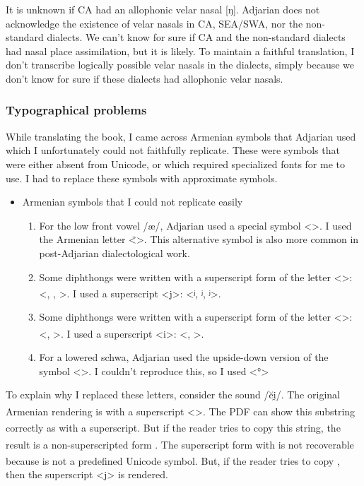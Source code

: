 It is unknown if CA had an allophonic velar nasal [ŋ]. Adjarian does not acknowledge the existence of velar nasals in CA, SEA/SWA, nor the non-standard dialects. We can't know for sure if CA and the non-standard dialects had nasal place assimilation, but it is likely. To maintain a faithful translation, I don't transcribe logically possible velar nasals in the dialects, simply because we don't know for sure if these dialects had allophonic velar nasals. 

\subsubsection{Typographical problems}\label{sec:HossepIntro:phonotransc:adj:typograph}

While translating the book, I came across Armenian symbols that Adjarian used which I unfortunately could not faithfully replicate. These were symbols that were either absent from Unicode, or which required specialized fonts for me to use. I had to replace these symbols with approximate symbols. 

\begin{itemize}
	\item Armenian symbols that I could not replicate easily 
	\begin{enumerate}
\item For the low front vowel /æ/, Adjarian used a special symbol 
<>. I used the  Armenian letter <̈>. This alternative symbol is also more common in post-Adjarian dialectological work. 
\item Some diphthongs were written with a superscript form of the letter <>: <\textsuperscript{}, \textsuperscript{},   \textsuperscript{}>. I used a superscript <j>: 	<ʲ, ʲ, ʲ>. 
\item Some diphthongs were written with a superscript form of the letter <>: <\textsuperscript{}, \textsuperscript{}>. I used a superscript <i>: 	<, >. 
\item For a lowered schwa, Adjarian used the  upside-down version of the symbol <>. I couldn't reproduce this, so I used  <°> 
	\end{enumerate}
\end{itemize}
 
To explain why I replaced these letters, consider the sound /ĕi̯/. The original Armenian rendering is \textsuperscript{} with a superscript <>. The PDF can show this substring correctly as \textsuperscript{}  with a superscript.  But if the reader tries to copy this string, the result is a non-superscripted form  . The superscript form with \textsuperscript{} is not recoverable because \textsuperscript{}  is not a predefined Unicode symbol. But, if the reader tries to copy 		, then the superscript <j> is rendered. 


